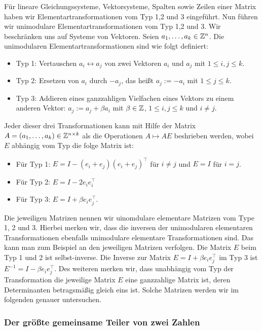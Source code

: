 	Für lineare Gleichungssysteme, Vektorsysteme, Spalten sowie Zeilen einer Matrix haben wir Elementartransformationen vom Typ 1,2 und 3 eingeführt. Nun führen wir unimodulare Elementartransformationen vom Typ 1,2 und 3. Wir beschränken uns auf Systeme von Vektoren. Seien $a_1,\ldots, a_k \in \mathbb Z^n$. Die unimodularen Elementartransformationen sind wie folgt definiert: 
	\begin{itemize} 
		\item[] Typ 1: Vertauschen $a_i \leftrightarrow a_j$ von zwei Vektoren $a_i$ und $a_j$ mit $1 \le i, j \le k$. 
		\item[] Typ 2: Ersetzen von $a_i$ durch $- a_j$, das heißt $a_j := - a_i$ mit $1 \le j \le k$. 
		\item[] Typ 3: Addieren eines ganzzahligen Vielfachen eines Vektors zu einem anderen Vektor: $a_j := a_j + \beta a_i$ mit $\beta \in \mathbb Z$, $1 \le i,j \le k$ und $i \ne j$. 
	\end{itemize} 
	Jeder dieser drei Transformationen kann mit Hilfe der Matrix $A = (a_1,\ldots,a_k) \in \mathbb Z^{n \times k}$ als die Operationen $A \mapsto A E$ beshrieben werden, wobei $E$  abhängig vom Typ die folge Matrix ist: 
	\begin{itemize} 
		\item[] Für Typ 1: $E = I - (e_i+e_j)(e_i+e_j)^\top$ für $i \ne j$ und $E = I$ für $i = j$. 
		\item[] Für Typ 2:  $E = I - 2 e_i e_i^\top$ 
		\item[] Für Typ 3: $E = I + \beta e_i e_j^\top$. 
	\end{itemize} 
	Die jeweiligen Matrizen nennen wir uinomdulare elementare Matrizen vom Type 1, 2 und 3. Hierbei merken wir, dass die inversen der unimodularen elementaren Transformationen ebenfalls unimodulare elementare Transformationen sind. Das kann man zum Beispiel an den jeweiligen Matrizen verfolgen. Die Matrix $E$ beim Typ 1 und 2 ist selbst-inverse. Die Inverse zur Matrix $E = I + \beta e_i e_j^\top$ im Typ 3 ist $E^{-1} = I - \beta e_i e_j^\top$. Des weiteren merken wir, dass unabhängig vom Typ der Transformation die jeweilige Matrix $E$ eine ganzzahlige Matrix ist, deren Determinanten betragsmäßig gleich eins ist. Solche Matrizen werden wir im folgenden genauer untersuchen. 
	
	\subsubsection{Der größte gemeinsame Teiler von zwei Zahlen}
	
